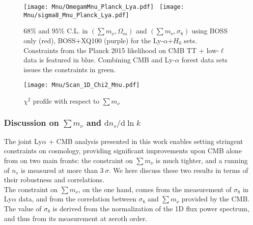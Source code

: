\begin{figure}
\begin{center}
\texttt{[image: Mnu/OmegamMnu\_Planck\_Lya.pdf]}~%
\texttt{[image: Mnu/sigma8\_Mnu\_Planck\_Lya.pdf]}
\caption{$68\%$ and $95\%$ C.L. in $\left( \sum m_\nu, \Omega_m \right)$ and $\left( \sum m_\nu, \sigma_8 \right)$ using BOSS only (red), BOSS+XQ100 (purple) for the Ly-$\alpha$+$H_0$ sets. Constraints from the Planck 2015 likelihood on CMB TT + low-$\ell$ data is featured in blue. Combining CMB and Ly-$\alpha$ forest data sets issues the constraints in green.}
\label{fig:c2d_om_sig}
\end{center}
\end{figure}


\begin{figure}
\begin{center}
\texttt{[image: Mnu/Scan\_1D\_Chi2\_Mnu.pdf]}
\caption{$\chi^2$ profile with respect to $\sum m_\nu$}
\label{fig:1d_scan}
\end{center}
\end{figure}





\subsubsection{Discussion on $\sum m_\nu$ and $\mathrm{d} n_s / \mathrm{d} \ln k$}

The joint Ly$\alpha$ + CMB analysis presented in this work enables setting stringent constraints on cosmology, providing significant improvements upon CMB  alone from \cite{Planck2015} on two main fronts: the constraint on $\sum m_\nu$ is much tighter, and a running of $n_s$ is measured at more than $3~\sigma$. We here discuss these two results in terms of their robustness and correlations. \\

The constraint on $\sum m_\nu$, on the one hand, comes from the measurement of $\sigma_8$ in Ly$\alpha$ data, and from the correlation between $\sigma_8$ and $\sum m_\nu$ provided by the CMB. The value of $\sigma_8$ is derived from the normalization of the 1D flux power spectrum, and thus from its measurement at zeroth order. \\

